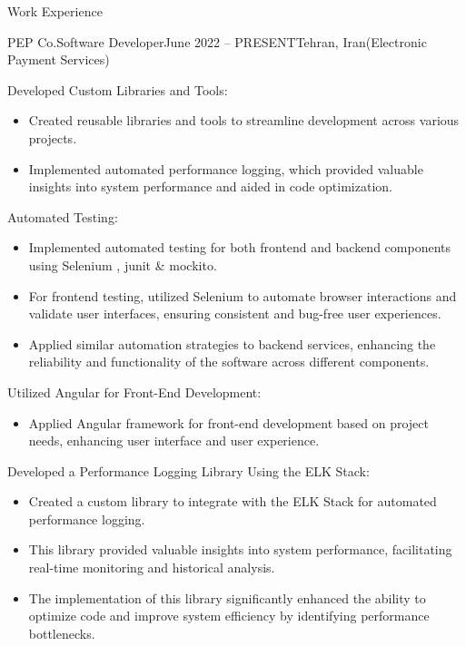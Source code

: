 \documentclass[]{kyvernitis-resume}
\begin{document}
\begin{section}{Work Experience}
\begin{subsection}{PEP Co.}{Software Developer}{June 2022 -- PRESENT}{Tehran, Iran}{(Electronic Payment Services)}
\begin{itemize}
			\end{itemize}

		\item Developed Custom Libraries and Tools:
			\begin{itemize}
				\item Created reusable libraries and tools to streamline development across various projects.
				\item Implemented automated performance logging, which provided valuable insights into system performance and aided in code optimization.
			\end{itemize}

		\item Automated Testing:
			\begin{itemize}
				\item Implemented automated testing for both frontend and backend components using Selenium , junit \& mockito.
				\item For frontend testing, utilized Selenium to automate browser interactions and validate user interfaces, ensuring consistent and bug-free user experiences.
				\item Applied similar automation strategies to backend services, enhancing the reliability and functionality of the software across different components.
			\end{itemize}

		\item Utilized Angular for Front-End Development:
			\begin{itemize}
				\item Applied Angular framework for front-end development based on project needs, enhancing user interface and user experience.
			\end{itemize}


		\item Developed a Performance Logging Library Using the ELK Stack:
			\begin{itemize}
			\item  Created a custom library to integrate with the ELK Stack for automated performance logging.
			\item  This library provided valuable insights into system performance, facilitating real-time monitoring and historical analysis.
			\item  The implementation of this library significantly enhanced the ability to optimize code and improve system efficiency by identifying performance bottlenecks.
			\end{itemize}



\end{subsection}
\end{section}
\end{document}
